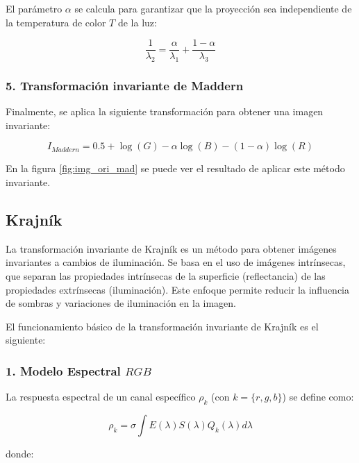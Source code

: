 El parámetro $\alpha$ se calcula para garantizar que la proyección sea independiente de la temperatura de color $T$ de la luz:

$$\frac{1}{\lambda_2 }=\frac{\alpha }{\lambda_1 }+\frac{1-\alpha }{\lambda_3 }$$

\subsubsection{5. Transformación invariante de Maddern}

Finalmente, se aplica la siguiente transformación para obtener una imagen invariante:

$$I_{Maddern} =0.5+\log (G)-\alpha \log (B)-(1-\alpha )\log (R)$$

En la figura \ref{fig:img_ori_mad} se puede ver el resultado de aplicar este método invariante.

\subsection{Krajník}\label{krajník}

La transformación invariante de Krajník \cite{krajník2015} es un método para obtener imágenes invariantes a cambios de iluminación. Se basa en el uso de imágenes intrínsecas, que separan las propiedades intrínsecas de la superficie (reflectancia) de las propiedades extrínsecas (iluminación). Este enfoque permite reducir la influencia de sombras y variaciones de iluminación en la imagen.

El funcionamiento básico de la transformación invariante de Krajník es el siguiente:

\subsubsection{1. Modelo Espectral $RGB$}

La respuesta espectral de un canal específico $\rho_k$ (con $k=\lbrace r,g,b\rbrace$) se define como:

$$\rho_k =\sigma \int E(\lambda )S(\lambda )Q_k (\lambda )d\lambda$$

donde:

